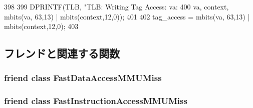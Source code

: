 \begin{DoxyCode}
398 {
399     DPRINTF(TLB, "TLB: Writing Tag Access: va: %
400             va, context, mbits(va, 63,13) | mbits(context,12,0));
401 
402     tag_access = mbits(va, 63,13) | mbits(context,12,0);
403 }
\end{DoxyCode}


\subsection{フレンドと関連する関数}
\hypertarget{classSparcISA_1_1TLB_a3d497ded3c85659ec4b013e2cae38c71}{
\subsubsection[{FastDataAccessMMUMiss}]{\setlength{\rightskip}{0pt plus 5cm}friend class {\bf FastDataAccessMMUMiss}}}
\label{classSparcISA_1_1TLB_a3d497ded3c85659ec4b013e2cae38c71}
\hypertarget{classSparcISA_1_1TLB_af8c3b0d2687d5c17d60fee3e4e77e20f}{
\subsubsection[{FastInstructionAccessMMUMiss}]{\setlength{\rightskip}{0pt plus 5cm}friend class {\bf FastInstructionAccessMMUMiss}}}
\label{classSparcISA_1_1TLB_af8c3b0d2687d5c17d60fee3e4e77e20f}


